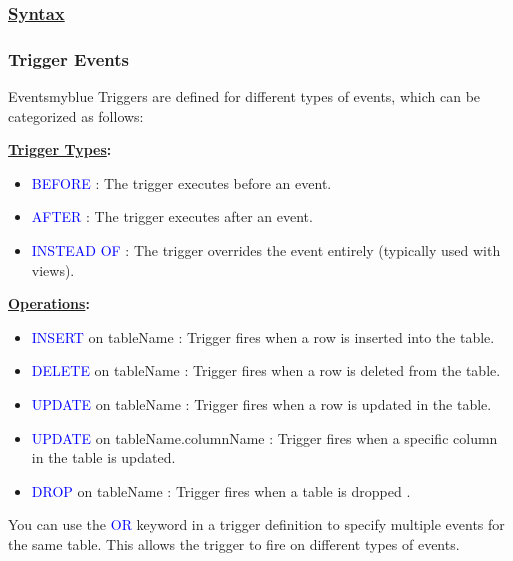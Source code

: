 \subsubsection*{\underline{Syntax}}






\subsubsection{Trigger Events}

\begin{prettyBox}{Events}{myblue}
Triggers are defined for different types of events, which can be categorized as follows:

\vspace{0.2cm}
\textbf{\underline{Trigger Types}:}
\begin{itemize}
    \item \textcolor{blue}{BEFORE} : The trigger executes before an event.
    \item \textcolor{blue}{AFTER} : The trigger executes after an event.
    \item \textcolor{blue}{INSTEAD OF} : The trigger overrides the event entirely (typically used with views).
\end{itemize}

\textbf{\underline{Operations}:}
\begin{itemize}
    \item \textcolor{blue}{INSERT} on tableName : Trigger fires when a row is inserted into the table.
    \item \textcolor{blue}{DELETE} on tableName : Trigger fires when a row is deleted from the table.
    \item \textcolor{blue}{UPDATE} on tableName : Trigger fires when a row is updated in the table.
    \item \textcolor{blue}{UPDATE} on tableName.columnName : Trigger fires when a specific column in the table is updated.
    \item \textcolor{blue}{DROP} on tableName : Trigger fires when a table is dropped .
\end{itemize}

You can use the \textcolor{blue}{OR} keyword in a trigger definition to specify multiple events for the same table. This allows the trigger to fire on different types of events.
\end{prettyBox}

